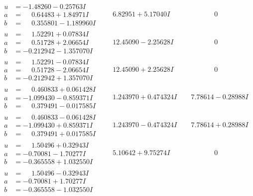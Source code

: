 \documentclass[1p]{elsarticle_modified}
\theoremstyle{definition}
\begin{document}
$$\begin{array}{c|c|c}
\begin{aligned}
u &= -1.48260 - 0.25763 I \\
a &= \phantom{-}0.64483 + 1.84971 I \\
b &= \phantom{-}0.355801 - 1.189960 I\end{aligned}
 & \phantom{-}6.82951 + 5.17040 I & \phantom{-0.000000 } 0 \\ \hline\begin{aligned}
u &= \phantom{-}1.52291 + 0.07834 I \\
a &= \phantom{-}0.51728 + 2.06654 I \\
b &= -0.212942 - 1.357070 I\end{aligned}
 & \phantom{-}12.45090 - 2.25628 I & \phantom{-0.000000 } 0 \\ \hline\begin{aligned}
u &= \phantom{-}1.52291 - 0.07834 I \\
a &= \phantom{-}0.51728 - 2.06654 I \\
b &= -0.212942 + 1.357070 I\end{aligned}
 & \phantom{-}12.45090 + 2.25628 I & \phantom{-0.000000 } 0 \\ \hline\begin{aligned}
u &= \phantom{-}0.460833 + 0.061428 I \\
a &= -1.099430 - 0.859371 I \\
b &= \phantom{-}0.379491 - 0.017585 I\end{aligned}
 & \phantom{-}1.243970 + 0.474324 I & \phantom{-}7.78614 - 0.28988 I \\ \hline\begin{aligned}
u &= \phantom{-}0.460833 - 0.061428 I \\
a &= -1.099430 + 0.859371 I \\
b &= \phantom{-}0.379491 + 0.017585 I\end{aligned}
 & \phantom{-}1.243970 - 0.474324 I & \phantom{-}7.78614 + 0.28988 I \\ \hline\begin{aligned}
u &= \phantom{-}1.50496 + 0.32943 I \\
a &= -0.70081 - 1.70277 I \\
b &= -0.365558 + 1.032550 I\end{aligned}
 & \phantom{-}5.10642 + 9.75274 I & \phantom{-0.000000 } 0 \\ \hline\begin{aligned}
u &= \phantom{-}1.50496 - 0.32943 I \\
a &= -0.70081 + 1.70277 I \\
b &= -0.365558 - 1.032550 I\end{aligned}

\end{array}$$
\end{document}
